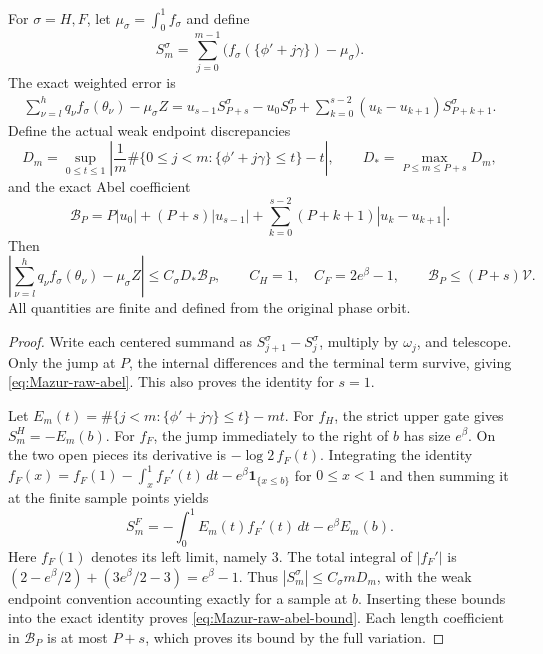 \begin{proposition}
\label{prop:Mazur-raw-abel}
For $\sigma=H,F$, let $\mu_\sigma=\int_0^1f_\sigma$ and define
\[
 S_m^\sigma=\sum_{j=0}^{m-1}
       \big(f_\sigma(\{\phi'+j\gamma\})-\mu_\sigma\big).
\]
The exact weighted error is
\begin{align}
 \sum_{\nu=l}^h q_\nu f_\sigma(\theta_\nu)-\mu_\sigma Z
 =u_{s-1}S_{P+s}^\sigma-u_0S_P^\sigma
       +\sum_{k=0}^{s-2}(u_k-u_{k+1})S_{P+k+1}^\sigma .
 \label{eq:Mazur-raw-abel}
\end{align}
Define the actual weak endpoint discrepancies
\[
 D_m=\sup_{0\le t\le1}
 \left|\frac1m\#\{0\le j<m:\{\phi'+j\gamma\}\le t\}-t\right|,
 \qquad D_*=\max_{P\le m\le P+s}D_m ,
\]
and the exact Abel coefficient
\[
 \mathcal B_P=P|u_0|+(P+s)|u_{s-1}|
       +\sum_{k=0}^{s-2}(P+k+1)|u_k-u_{k+1}|.
\]
Then
\begin{equation}
 \left|\sum_{\nu=l}^h q_\nu f_\sigma(\theta_\nu)-\mu_\sigma Z\right|
 \le C_\sigma D_*\mathcal B_P,\qquad
 C_H=1,\quad C_F=2e^\beta-1,\qquad
 \mathcal B_P\le(P+s)\mathcal V .
 \label{eq:Mazur-raw-abel-bound}
\end{equation}
All quantities are finite and defined from the original phase orbit.
\end{proposition}
\begin{proof}
Write each centered summand as $S_{j+1}^\sigma-S_j^\sigma$,
multiply by $\omega_j$, and telescope. Only the jump at $P$,
the internal differences and the terminal term survive, giving
\eqref{eq:Mazur-raw-abel}. This also proves the identity for $s=1$.

Let $E_m(t)=\#\{j<m:\{\phi'+j\gamma\}\le t\}-mt$.
For $f_H$, the strict upper gate gives $S_m^H=-E_m(b)$.
For $f_F$, the jump immediately to the right of $b$ has size $e^\beta$.
On the two open pieces its derivative is $-\log2\,f_F(t)$.
Integrating the identity
$f_F(x)=f_F(1)-\int_x^1 f_F'(t)\,dt
-e^\beta\mathbf1_{\{x\le b\}}$ for $0\le x<1$
and then summing it at the finite sample points yields
\[
 S_m^F=-\int_0^1 E_m(t)f_F'(t)\,dt-e^\beta E_m(b).
\]
Here $f_F(1)$ denotes its left limit, namely $3$.
The total integral of $|f_F'|$ is
$(2-e^\beta/2)+(3e^\beta/2-3)=e^\beta-1$.
Thus $|S_m^\sigma|\le C_\sigma mD_m$, with the weak
endpoint convention accounting exactly for a sample at $b$.
Inserting these bounds into the exact identity proves
\eqref{eq:Mazur-raw-abel-bound}.
Each length coefficient in $\mathcal B_P$ is at most $P+s$,
which proves its bound by the full variation.
\end{proof}

